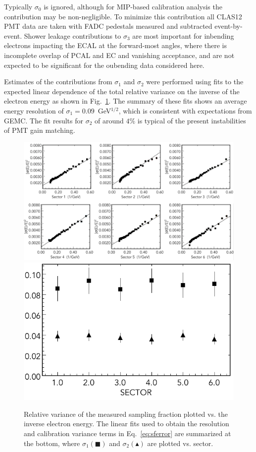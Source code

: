 Typically $\sigma_0$ is ignored, although for MIP-based calibration analysis the contribution may be non-negligible.
To minimize this contribution all CLAS12 PMT data are taken with FADC pedestals measured and subtracted
event-by-event. Shower leakage contributions to $\sigma_3$ are most important for inbending electrons impacting
the ECAL at the forward-most angles, where there is incomplete overlap of PCAL and EC and vanishing acceptance, and are not expected to be significant for the oubending data considered here.

Estimates of the contributions from $\sigma_1$ and $\sigma_2$ were performed using fits to the expected linear
dependence of the total relative variance on the inverse of the electron energy as shown in Fig.~\ref{fig:S10_1_1}.
The summary of these fits shows an average energy resolution of $\sigma_1 = 0.09$~GeV$^{1/2}$, which is consistent
with expectations from GEMC. The fit results for $\sigma_2$ of around $4\%$ is typical of the present instabilities
of PMT gain matching.
 
\begin{figure}[t]
\centering
\includegraphics[width=1.0\columnwidth,keepaspectratio]{img/S10_1_1.png}
\includegraphics[width=0.5\columnwidth,keepaspectratio]{img/S10_1_2.png}
\caption[]{Relative variance of the measured sampling fraction plotted vs. the inverse electron energy. The
  linear fits used to obtain the resolution and calibration variance terms in Eq.~\ref{eq:sferror} are summarized
  at the bottom, where $\sigma_1 (\blacksquare)$ and $\sigma_2 (\blacktriangle)$ are plotted vs. sector.}
\label{fig:S10_1_1}
\end{figure}

